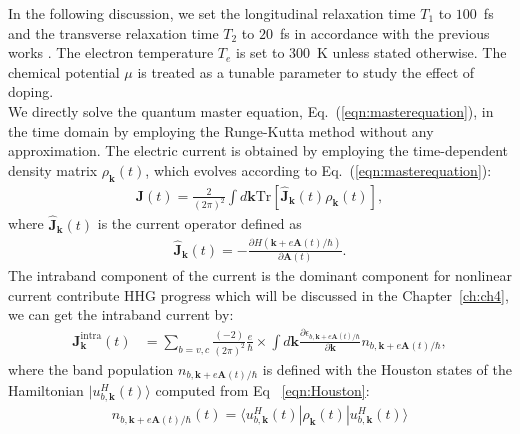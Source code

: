 In the following discussion, we set the longitudinal relaxation time $T_1$ to $100$~fs and the transverse relaxation time $T_2$ to $20$~fs in accordance with the previous works \cite{sato2021nonlinear,sato2021high,sato2019light,sato2019microscopic}. The electron temperature $T_e$ is set to $300$~K unless stated otherwise. The chemical potential $\mu$ is treated as a tunable parameter to study the effect of doping.\\
We directly solve the quantum master equation, Eq.~(\ref{eqn:masterequation}), in the time domain by employing the Runge-Kutta method without any approximation.
The electric current is obtained by employing the time-dependent density matrix $\rho_{\mathbf k}(t)$, which evolves according to Eq.~(\ref{eqn:masterequation}):
\begin{eqnarray}
  \mathbf{J}(t)=\frac{2}{(2\pi)^2} \int d\mathbf k \mathrm{Tr}\left[\hat{\mathbf{J}}_{\mathbf{k}}(t)\rho_{\mathbf{k}}(t)\right],
\label{eqn:totalcurrent}
\end{eqnarray}
where $\hat{\mathbf{J}}_{\mathbf{k}}(t)$ is the current operator defined as
\begin{align}
\hat{\mathbf J}_{\mathbf{k}}(t) = -\frac{\partial H(\mathbf{k}+e\mathbf{A}(t)/\hbar)}{\partial \mathbf A(t)}.
\label{totalcurrent}
\end{align}
The intraband component of the current is the dominant component for nonlinear current contribute
HHG progress which will be discussed in the Chapter~\ref{ch:ch4}, we can get the intraband current by:
\begin{align}
\mathbf{J}^{\mathrm{intra}}_{\mathbf k}(t)&=\sum_{b=v,c} \frac{(-2)}{(2\pi)^2}
\frac{e}{\hbar} \nonumber \times  
\int d\mathbf{k}\frac{\partial\epsilon_{b,\mathbf{k}+e\mathbf{A}(t)/\hbar}}{\partial\mathbf{k}} n_{b,\mathbf{k}+e\mathbf{A}(t)/\hbar},
\label{eqn:intra-steady-current}
\end{align}
where the band population $n_{b,\mathbf{k}+e\mathbf{A}(t)/\hbar}$ is defined with the Houston states of the Hamiltonian $|u^H_{b,\mathbf k} (t)\rangle$ computed from Eq ~\ref{eqn:Houston}:
\begin{align}
n_{b,\mathbf{k}+e\mathbf{A}(t)/\hbar}(t)=\langle u^H_{b,\mathbf k}(t) |\rho_{\mathbf{k}}(t)|u^H_{b,\mathbf k}(t) \rangle
\end{align}


